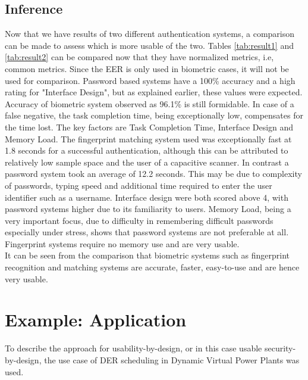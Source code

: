 \subsection{Inference}
Now that we have results of two different authentication systems, a comparison can be made to assess which is more usable of the two. Tables \ref{tab:result1} and \ref{tab:result2} can be compared now that they have normalized metrics, i.e, common metrics. Since the EER is only used in biometric cases, it will not be used for comparison. Password based systems have a 100\% accuracy and a high rating for "Interface Design", but as explained earlier, these values were expected. Accuracy of biometric system observed as 96.1\% is still formidable. In case of a false negative, the task completion time, being exceptionally low, compensates for the time lost. The key factors are Task Completion Time, Interface Design and Memory Load. The fingerprint matching system used was exceptionally fast at 1.8 seconds for a successful authentication, although this can be attributed to relatively low sample space and the user of a capacitive scanner. In contrast a password system took an average of 12.2 seconds. This may be due to complexity of passwords, typing speed and additional time required to enter the user identifier such as a username. Interface design were both scored above 4, with password systems higher due to its familiarity to users. Memory Load, being a very important focus, due to difficulty in remembering difficult passwords especially under stress, shows that password systems are not preferable at all. Fingerprint systems require no memory use and are very usable.\\
It can be seen from the comparison that biometric systems such as fingerprint recognition and matching systems are accurate, faster, easy-to-use and are hence very usable. 

\section{Example: Application}
To describe the approach for usability-by-design, or in this case usable security-by-design, the use case of DER scheduling in Dynamic Virtual Power Plants was used. 

